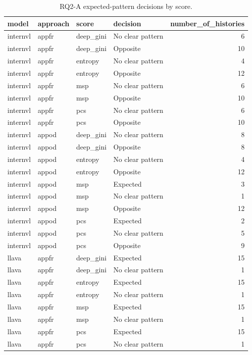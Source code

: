 \begin{table}[tbp]
\caption{RQ2-A expected-pattern decisions by score.}
\label{tab:rq2a-expected-pattern-summary-by-score}
\begin{tabular}{llllr}
\toprule
model & approach & score & decision & number\_of\_histories \\
\midrule
internvl & appfr & deep\_gini & No clear pattern & 6 \\
internvl & appfr & deep\_gini & Opposite & 10 \\
internvl & appfr & entropy & No clear pattern & 4 \\
internvl & appfr & entropy & Opposite & 12 \\
internvl & appfr & msp & No clear pattern & 6 \\
internvl & appfr & msp & Opposite & 10 \\
internvl & appfr & pcs & No clear pattern & 6 \\
internvl & appfr & pcs & Opposite & 10 \\
internvl & appod & deep\_gini & No clear pattern & 8 \\
internvl & appod & deep\_gini & Opposite & 8 \\
internvl & appod & entropy & No clear pattern & 4 \\
internvl & appod & entropy & Opposite & 12 \\
internvl & appod & msp & Expected & 3 \\
internvl & appod & msp & No clear pattern & 1 \\
internvl & appod & msp & Opposite & 12 \\
internvl & appod & pcs & Expected & 2 \\
internvl & appod & pcs & No clear pattern & 5 \\
internvl & appod & pcs & Opposite & 9 \\
llava & appfr & deep\_gini & Expected & 15 \\
llava & appfr & deep\_gini & No clear pattern & 1 \\
llava & appfr & entropy & Expected & 15 \\
llava & appfr & entropy & No clear pattern & 1 \\
llava & appfr & msp & Expected & 15 \\
llava & appfr & msp & No clear pattern & 1 \\
llava & appfr & pcs & Expected & 15 \\
llava & appfr & pcs & No clear pattern & 1 \\

\end{tabular}
\end{table}

